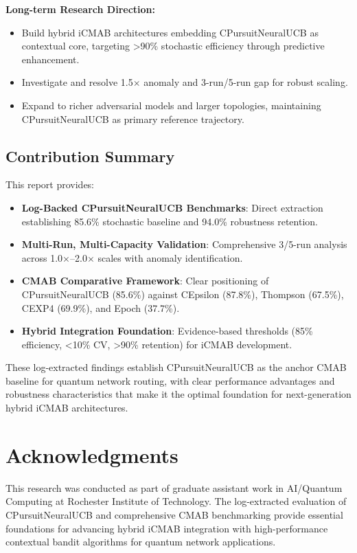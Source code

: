 \documentclass[12pt,a4paper]{article}
\newcommand{\primarytext}[1]{\textcolor{primaryblue}{\textbf{#1}}}
\newcommand{\secondarytext}[1]{\textcolor{secondaryblue}{\textbf{#1}}}
\newcommand{\success}[1]{\textcolor{accentgreen}{\textbf{#1}}}
\begin{document}
\textbf{Long-term Research Direction:}
\begin{itemize}
    \item Build hybrid iCMAB architectures embedding CPursuitNeuralUCB as contextual core, targeting >90\% stochastic efficiency through predictive enhancement.
    \item Investigate and resolve 1.5$\times$ anomaly and 3-run/5-run gap for robust scaling.
    \item Expand to richer adversarial models and larger topologies, maintaining CPursuitNeuralUCB as primary reference trajectory.
\end{itemize}

\subsection{Contribution Summary}

This report provides:

\begin{itemize}
    \item \primarytext{Log-Backed CPursuitNeuralUCB Benchmarks}: Direct extraction establishing 85.6\% stochastic baseline and 94.0\% robustness retention.
    
    \item \success{Multi-Run, Multi-Capacity Validation}: Comprehensive 3/5-run analysis across 1.0$\times$–2.0$\times$ scales with anomaly identification.
    
    \item \secondarytext{CMAB Comparative Framework}: Clear positioning of CPursuitNeuralUCB (85.6\%) against CEpsilon (87.8\%), Thompson (67.5\%), CEXP4 (69.9\%), and Epoch (37.7\%).
    
    \item \textbf{Hybrid Integration Foundation}: Evidence-based thresholds (85\% efficiency, <10\% CV, >90\% retention) for iCMAB development.
\end{itemize}

These log-extracted findings establish CPursuitNeuralUCB as the anchor CMAB baseline for quantum network routing, with clear performance advantages and robustness characteristics that make it the optimal foundation for next-generation hybrid iCMAB architectures.

\section{Acknowledgments}

This research was conducted as part of graduate assistant work in AI/Quantum Computing at Rochester Institute of Technology. The log-extracted evaluation of CPursuitNeuralUCB and comprehensive CMAB benchmarking provide essential foundations for advancing hybrid iCMAB integration with high-performance contextual bandit algorithms for quantum network applications.
\end{document}
